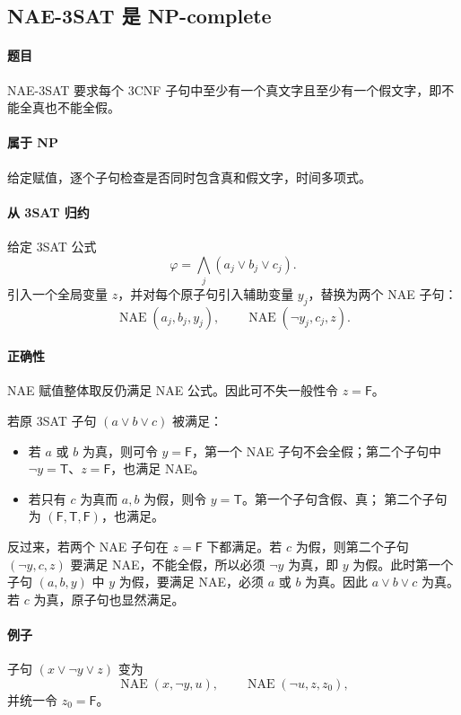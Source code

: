 \documentclass[UTF8,openany,12pt]{ctexbook}
\theoremstyle{remark}
\begin{document}
\subsection{NAE-3SAT 是 NP-complete}

\paragraph{题目}
NAE-3SAT 要求每个 3CNF 子句中至少有一个真文字且至少有一个假文字，即不能全真也不能全假。

\paragraph{属于 NP}
给定赋值，逐个子句检查是否同时包含真和假文字，时间多项式。

\paragraph{从 3SAT 归约}
给定 3SAT 公式
\[
  \varphi=\bigwedge_j (a_j\vee b_j\vee c_j).
\]
引入一个全局变量 $z$，并对每个原子句引入辅助变量 $y_j$，替换为两个 NAE 子句：
\[
  \operatorname{NAE}(a_j,b_j,y_j),
  \qquad
  \operatorname{NAE}(\neg y_j,c_j,z).
\]

\paragraph{正确性}
NAE 赋值整体取反仍满足 NAE 公式。因此可不失一般性令 $z=\mathsf{F}$。

若原 3SAT 子句 $(a\vee b\vee c)$ 被满足：
\begin{itemize}
  \item 若 $a$ 或 $b$ 为真，则可令 $y=\mathsf{F}$，第一个 NAE 子句不会全假；第二个子句中
  $\neg y=\mathsf{T}$、$z=\mathsf{F}$，也满足 NAE。
  \item 若只有 $c$ 为真而 $a,b$ 为假，则令 $y=\mathsf{T}$。第一个子句含假、真；
  第二个子句为 $(\mathsf{F},\mathsf{T},\mathsf{F})$，也满足。
\end{itemize}

反过来，若两个 NAE 子句在 $z=\mathsf{F}$ 下都满足。若 $c$ 为假，则第二个子句
$(\neg y,c,z)$ 要满足 NAE，不能全假，所以必须 $\neg y$ 为真，即 $y$ 为假。此时第一个子句
$(a,b,y)$ 中 $y$ 为假，要满足 NAE，必须 $a$ 或 $b$ 为真。因此 $a\vee b\vee c$ 为真。
若 $c$ 为真，原子句也显然满足。

\paragraph{例子}
子句 $(x\vee \neg y\vee z)$ 变为
\[
  \operatorname{NAE}(x,\neg y,u),
  \qquad
  \operatorname{NAE}(\neg u,z,z_0),
\]
并统一令 $z_0=\mathsf{F}$。
\end{document}

